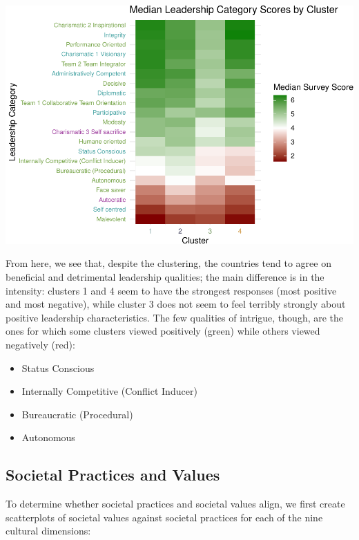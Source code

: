 \documentclass[
]{article}
\providecommand{\tightlist}{%
  \setlength{\itemsep}{0pt}\setlength{\parskip}{0pt}}
\begin{document}
\begin{center}\includegraphics[width=0.85\linewidth]{final_report_files/figure-latex/cluster_values-1} \end{center}

From here, we see that, despite the clustering, the countries tend to
agree on beneficial and detrimental leadership qualities; the main
difference is in the intensity: clusters 1 and 4 seem to have the
strongest responses (most positive and most negative), while cluster 3
does not seem to feel terribly strongly about positive leadership
characteristics. The few qualities of intrigue, though, are the ones for
which some clusters viewed positively (green) while others viewed
negatively (red):

\begin{itemize}
\tightlist
\item
  Status Conscious
\item
  Internally Competitive (Conflict Inducer)
\item
  Bureaucratic (Procedural)
\item
  Autonomous
\end{itemize}

\hypertarget{societal-practices-and-values}{%
\subsection{Societal Practices and
Values}\label{societal-practices-and-values}}

To determine whether societal practices and societal values align, we
first create scatterplots of societal values against societal practices
for each of the nine cultural dimensions:
\end{document}

